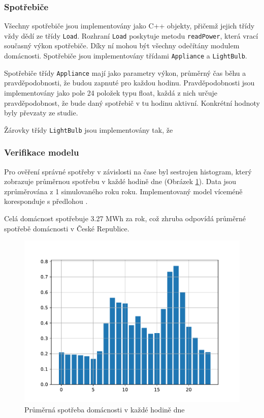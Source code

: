 \documentclass[12pt,a4paper]{article}
\begin{document}
\subsubsection{Spotřebiče}
Všechny spotřebiče jsou implementovány jako C++ objekty, přičemž jejich třídy vždy dědí ze třídy \texttt{Load}.
Rozhraní \texttt{Load} poskytuje metodu \texttt{readPower}, která vrací současný výkon spotřebiče.
Díky ní mohou být všechny odečítány modulem domácnosti.
Spotřebiče jsou implementovány třídami \texttt{Appliance} a \texttt{LightBulb}.

Spotřebiče třídy \texttt{Appliance} mají jako parametry výkon, průměrný čas běhu a pravděpodobnosti, že budou zapnuté pro každou hodinu.
Pravděpodobnosti jsou implementovány jako pole 24 položek typu float,
každá z nich určuje pravděpodobnost, že bude daný spotřebič v tu hodinu aktivní.
Konkrétní hodnoty byly převzaty ze studie. \cite{TORRITI201737}

Žárovky třídy \texttt{LightBulb} jsou implementovány tak,
že


\subsubsection{Verifikace modelu}

Pro ověření správné spotřeby v závislosti na čase byl sestrojen histogram,
který zobrazuje průměrnou spotřebu v každé hodině dne (Obrázek \ref{fig:average_day_load}).
Data jsou zprůměrována z 1 simulovaného roku roku.
Implementovaný model víceméně koresponduje s předlohou \cite{TORRITI201737}.

Celá domácnost spotřebuje 3.27 MWh za rok, což zhruba odpovídá průměrné spotřebě domácnosti v České Republice\cite{CEZ}.

\begin{figure}
\includegraphics[width=\linewidth]{img/average_day_load.pdf}
\caption{Průměrná spotřeba domácnosti v každé hodině dne}
\label{fig:average_day_load}
\end{figure}
\end{document}
